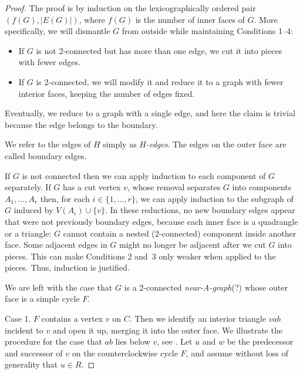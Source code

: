 \documentclass{patmorin}
\begin{document}
\begin{proof}
The proof is by induction
   on the lexicographically ordered pair $(f(G),|E(G)|)$, where $f(G)$
is the number of inner faces of $G$. 
More specifically, %
we will dismantle $G$
 from outside while maintaining
 Conditions 1--4:
\begin{itemize}
\item If $G$ is not 2-connected but has more than one edge, we cut it
  into pieces with fewer edges.
\item If $G$ is 2-connected, we will modify it and reduce it to a
  graph
with fewer interior faces,
keeping the number of edges fixed.
\end{itemize}
Eventually, we reduce to a graph with a single edge, and here the
claim is trivial because the edge belongs to the boundary.

   We refer to the edges of $H$ simply as \emph{$H$-edges}.
The edges on the outer
   face are called boundary edges.

If $G$ is not connected then we can apply induction to each component
   of $G$ separately. If $G$ has a cut vertex $v$, whose removal
   separates $G$ into components $A_1,\ldots,A_r$ then, for each
   $i\in\{1,\ldots,r\}$, we can apply induction to the subgraph of $G$
   induced by $V(A_i)\cup\{v\}$.  
In these reductions, no new boundary edges appear that were not
previously boundary edges, because each inner face is
a quadrangle or a triangle: $G$ cannot contain a nested (2-connected) component
inside another face.
Some adjacent edges in $G$ might no longer be adjacent
after we cut $G$ into pieces. This can make Conditions 2 and~3 only weaker
when applied to the pieces. Thus, induction is justified.

We are left with the case that $G$ is a 2-connected \emph{near-A-graph}(?) whose outer face 
   is a simple cycle $F$.

Case 1. $F$ contains a vertex $v$ on $C$.
Then we identify an interior triangle $vab$ incident to $v$ and open it up,
merging it into the outer face.
We illustrate the procedure for the case that $ab$ lies below $v$, see
.
Let $u$ and $w$ be the predecessor and successor of $v$ on the
counterclockwise cycle $F$, and assume without loss of generality that $u\in R$.


\end{proof}
\end{document}
